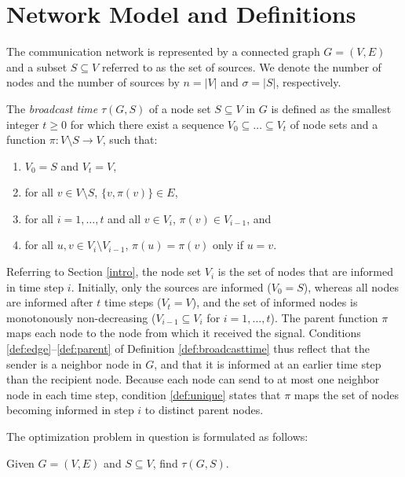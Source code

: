 \section{Network Model and Definitions} \label{sec:def}

The communication network is represented by a connected graph $G=(V,E)$ and a subset $S\subseteq V$ referred to as the set of sources.
We denote the number of nodes and the number of sources by $n=|V|$ and $\sigma=|S|$, respectively. 

\begin{definition} \label{def:broadcasttime}
The \emph{broadcast time} $\tau(G,S)$ of a node set $S\subseteq V$ in $G$ is defined as the smallest integer $t\geq 0$ for which there exist
a sequence $V_0\subseteq\dots\subseteq V_t$ of node sets and a function $\pi:V\setminus S\to V$, such that:
\begin{enumerate}
  \item $V_0=S$ and $V_t=V$, \label{def:boundary}
  \item for all $v\in V\setminus S$, $\{v,\pi(v)\}\in E$, \label{def:edge}
  \item for all $i=1,\ldots,t$ and all $v\in V_i$, $\pi(v)\in V_{i-1}$, and \label{def:parent}
  \item for all $u,v\in V_i\setminus V_{i-1}$, $\pi(u)=\pi(v)$ only if $u=v$. \label{def:unique}
\end{enumerate}
\end{definition}

Referring to Section \ref{intro}, the node set $V_i$ is the set of nodes that are informed in time step $i$.
Initially, only the sources are informed ($V_0=S$), whereas all nodes are informed after $t$ time steps ($V_t=V$),
and the set of informed nodes is monotonously non-decreasing ($V_{i-1}\subseteq V_i$ for $i=1,\ldots,t$).
The parent function $\pi$ maps each node to the node from which it received the signal.
Conditions \ref{def:edge}--\ref{def:parent} of Definition \ref{def:broadcasttime} thus reflect that the sender is a neighbor node in $G$,
and that it is informed at an earlier time step than the recipient node.
Because each node can send to at most one neighbor node in each time step,
condition \ref{def:unique} states that $\pi$ maps the set of nodes becoming informed in step $i$ to distinct parent nodes.

The optimization problem in question is formulated as follows:
\begin{problem}\label{prob:min}
Given $G=(V,E)$ and $S\subseteq V$, find $\tau(G,S)$.
\end{problem}

